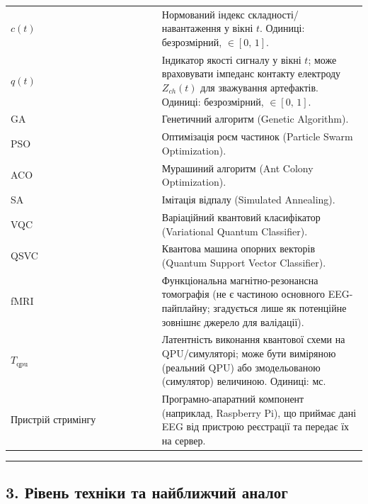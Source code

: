 \documentclass[12pt,a4paper]{article}
\begin{document}
{\begin{longtable}[]{@{}

  >{\raggedright\arraybackslash}p{0.4211\linewidth}

  >{\raggedright\arraybackslash}p{0.5789\linewidth}@{}}
\(c(t)\) & Нормований індекс складності/навантаження у вікні \(t\). Одиниці: безрозмірний, \(\in [0,\,1]\). \\

\(q(t)\) & Індикатор якості сигналу у вікні \(t\); може враховувати імпеданс контакту електроду \(Z_{ch}(t)\) для зважування артефактів. Одиниці: безрозмірний, \(\in [0,\,1]\). \\

GA & Генетичний алгоритм (Genetic Algorithm). \\

PSO & Оптимізація роєм частинок (Particle Swarm Optimization). \\

ACO & Мурашиний алгоритм (Ant Colony Optimization). \\

SA & Імітація відпалу (Simulated Annealing). \\

VQC & Варіаційний квантовий класифікатор (Variational Quantum Classifier). \\

QSVC & Квантова машина опорних векторів (Quantum Support Vector Classifier). \\

fMRI & Функціональна магнітно-резонансна томографія (не є частиною основного EEG-пайплайну; згадується лише як потенційне зовнішнє джерело для валідації). \\

\(T_{\text{qpu}}\) & Латентність виконання квантової схеми на QPU/симуляторі; може бути виміряною (реальний QPU) або змодельованою (симулятор) величиною. Одиниці: мс. \\

Пристрій стримінгу & Програмно-апаратний компонент (наприклад, Raspberry Pi), що приймає дані EEG від пристрою реєстрації та передає їх на сервер. \\

\end{longtable}

}



\begin{center}\rule{0.5\linewidth}{0.5pt}\end{center}



\subsection{3. Рівень техніки та найближчий аналог}\label{ux440ux456ux432ux435ux43dux44c-ux442ux435ux445ux43dux456ux43aux438-ux442ux430-ux43dux430ux439ux431ux43bux438ux436ux447ux438ux439-ux430ux43dux430ux43bux43eux433}
\end{document}
